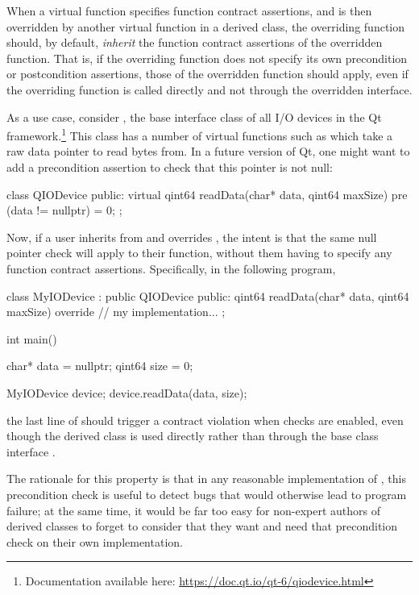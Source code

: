 
When a virtual function specifies function contract assertions, and is then overridden by another virtual function in a derived class, the overriding function should, by default, \emph{inherit} the function contract assertions of the overridden function. That is, if the overriding function does not specify its own precondition or postcondition assertions, those of the overridden function should apply, even if the overriding function is called directly and not through the overridden interface.

As a use case, consider , the base interface class of all I/O devices in the Qt framework.\footnote{Documentation available here: \url{https://doc.qt.io/qt-6/qiodevice.html}} This class has a number of virtual functions such as  which take a raw data pointer to read bytes from. In a future version of Qt, one might want to add a precondition assertion to check that this pointer is not null:
\begin{codeblock}
class QIODevice {
public:
  virtual qint64 readData(char* data, qint64 maxSize)
    pre (data != nullptr) = 0;
};
\end{codeblock}
Now, if a user inherits from  and overrides , the intent is that the same null pointer check will apply to their function, without them having to specify any function contract assertions. Specifically, in the following program,
\begin{codeblock}
class MyIODevice : public QIODevice {
public:
  qint64 readData(char* data, qint64 maxSize) override {
    // my implementation...
  }
};

int main() {
  char* data = nullptr;
  qint64 size = 0;
  
  MyIODevice device;
  device.readData(data, size);
}
\end{codeblock}
the last line of  should trigger a contract violation when checks are enabled, even though the derived class  is used directly rather than through the base class interface . 

The rationale for this property is that in any reasonable implementation of , this precondition check is useful to detect bugs that would otherwise lead to program failure; at the same time, it would be far too easy for non-expert authors of derived classes to forget to consider that they want and need that precondition check on their own implementation.

